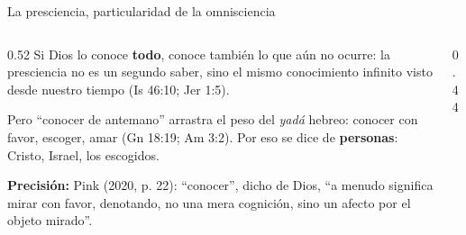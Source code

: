\documentclass[hyperref={bookmarks=false},aspectratio=169]{beamer}
\newcommand{\destacar}[1]{\textbf{\textcolor{azul}{#1}}}
\newcommand{\precision}[1]{{\footnotesize\color{gris}\textbf{Precisión:} #1}}
\begin{document}
\begin{frame}{La presciencia, particularidad de la omnisciencia}
\begin{columns}[c,onlytextwidth]
\begin{column}{0.52\textwidth}\small
Si Dios lo conoce \destacar{todo}, conoce también lo que aún no ocurre: la presciencia no es un segundo saber, sino el mismo conocimiento infinito visto desde nuestro tiempo (Is 46:10; Jer 1:5).\par\medskip
Pero ``conocer de antemano'' arrastra el peso del \emph{yadá} hebreo: conocer con favor, escoger, amar (Gn 18:19; Am 3:2). Por eso se dice de \destacar{personas}: Cristo, Israel, los escogidos.\par\medskip
\precision{Pink (2020, p. 22): ``conocer'', dicho de Dios, ``a menudo significa mirar con favor, denotando, no una mera cognición, sino un afecto por el objeto mirado''.}
\end{column}
\begin{column}{0.44\textwidth}\centering
{}
\end{column}
\end{columns}
\end{frame}
\end{document}

